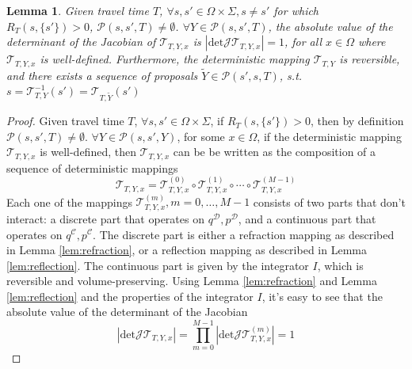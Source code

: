 \documentclass{article}
\newcommand{\cald}{\mathcal{D}}
\newcommand{\calc}{\mathcal{C}}
\newtheorem{lemma}{Lemma}
\begin{document}
\begin{lemma}
	\label{lem:prob_path}
	Given travel time $T$, $\forall s, s'\in\Omega\times\Sigma, s\neq s'$ for which $R_T(s, \{s'\})>0$, $\mathcal{P}(s, s', T)\neq\emptyset$. $\forall Y\in\mathcal{P}(s, s', T)$, the absolute value of the determinant of the Jacobian of $\mathcal{T}_{T, Y, x}$ is $|\text{det}\mathcal{J}\mathcal{T}_{T, Y, x}| = 1$, for all $x\in\Omega$ where $\mathcal{T}_{T, Y, x}$ is well-defined. Furthermore, the deterministic mapping $\mathcal{T}_{T, Y}$ is reversible, and there exists a sequence of proposals $\tilde{Y}\in\mathcal{P}(s', s, T)$, s.t. $s = \mathcal{T}_{T, Y}^{-1}(s') = \mathcal{T}_{T, \tilde{Y}}(s')$
\end{lemma}

\begin{proof}
	Given travel time $T$, $\forall s, s'\in\Omega\times\Sigma$, if $R_T(s, \{ s'\}) > 0$, then by definition $\mathcal{P}(s, s', T)\neq\emptyset$. $\forall Y\in\mathcal{P}(s, s', Y)$, for some $x\in\Omega$, if the deterministic mapping $\mathcal{T}_{T, Y, x}$ is well-defined, then $\mathcal{T}_{T, Y, x}$ can be be written as the composition of a sequence of deterministic mappings
$$\mathcal{T}_{T, Y, x} = \mathcal{T}^{(0)}_{T, Y, x} \circ \mathcal{T}_{T, Y, x}^{(1)} \circ \cdots \circ \mathcal{T}_{T, Y, x}^{(M - 1)}$$
Each one of the mappings $\mathcal{T}_{T, Y, x}^{(m)}, m = 0, \ldots, M - 1$ consists of two parts that don't interact: a discrete part that operates on $q^\cald, p^\cald$, and a continuous part that operates on $q^\calc, p^\calc$. The discrete part is either a refraction mapping as described in Lemma \ref{lem:refraction}, or a reflection mapping as described in Lemma \ref{lem:reflection}. The continuous part is given by the integrator $I$, which is reversible and volume-preserving. Using Lemma \ref{lem:refraction} and Lemma \ref{lem:reflection} and the properties of the integrator $I$, it's easy to see that the absolute value of the determinant of the Jacobian
\[ | \text{det}\mathcal{J} \mathcal{T}_{T, Y, x} | = \prod_{m = 0}^{M - 1} | \text{det}\mathcal{J}
   \mathcal{T}_{T, Y, x}^{(m)} | = 1 \]


\end{proof}
\end{document}
